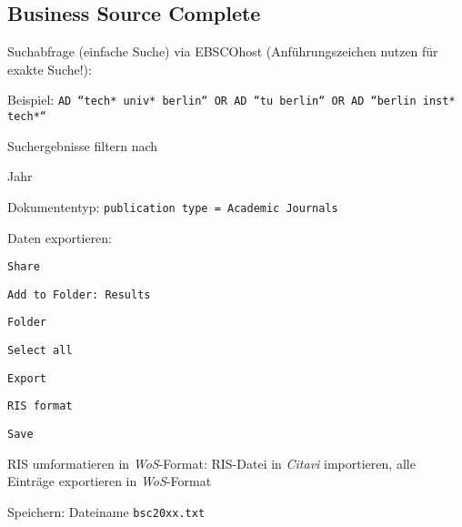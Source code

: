 \subsection*{Business Source Complete}
\begin{compactitem}
\item Suchabfrage (einfache Suche) via EBSCOhost (Anführungszeichen nutzen für exakte Suche!):
	\begin{compactitem}
	\item Beispiel: \texttt{AD ``tech* univ* berlin``  OR AD ``tu berlin`` OR AD ``berlin \newline inst* tech*``}
	\end{compactitem}
\item Suchergebnisse filtern nach
	\begin{compactitem}
    \item Jahr
    \item Dokumententyp: \texttt{publication type = Academic Journals}
    \end{compactitem}
\item Daten exportieren: 
	\begin{compactitem}
	\item \texttt{Share}
    \item \texttt{Add to Folder: Results}
    \item \texttt{Folder}
    \item \texttt{Select all}
    \item \texttt{Export}
    \item \texttt{RIS format}
    \item \texttt{Save}
	\end{compactitem}
\item RIS umformatieren in \textit{WoS}-Format: RIS-Datei in \textit{Citavi} importieren, alle Einträge exportieren in \textit{WoS}-Format
\item Speichern: Dateiname \texttt{bsc20xx.txt}
\end{compactitem}

